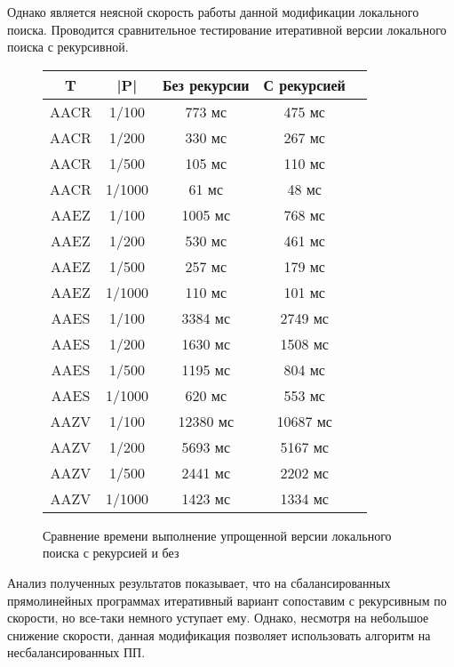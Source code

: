 \documentclass[14pt]{article}
\begin{document}
Однако является неясной скорость работы данной модификации локального поиска. Проводится сравнительное тестирование итеративной версии локального поиска с рекурсивной. 

\begin{figure}
	\begin{center}
\begin{tabular}{ | c | c | c | c | c |}
        \hline T & |P| & Без рекурсии & С рекурсией\\
        \hline AACR & 1/100 & 773 мс & 475  мс\\
        \hline AACR & 1/200 & 330 мс & 267  мс\\
        \hline AACR & 1/500 & 105 мс & 110  мс\\
        \hline AACR & 1/1000 & 61 мс & 48 мс\\
        \hline AAEZ & 1/100 & 1005 мс & 768  мс\\
        \hline AAEZ & 1/200 & 530 мс & 461  мс\\
        \hline AAEZ & 1/500 & 257 мс & 179  мс\\
        \hline AAEZ & 1/1000 & 110 мс & 101 мс\\
        \hline AAES & 1/100 & 3384 мс & 2749  мс\\
        \hline AAES & 1/200 & 1630 мс & 1508 мс\\
        \hline AAES & 1/500 & 1195 мс & 804  мс\\
        \hline AAES & 1/1000 & 620 мс & 553  мс\\
        \hline AAZV & 1/100 & 12380 мс & 10687  мс\\
        \hline AAZV & 1/200 & 5693 мс & 5167  мс\\
        \hline AAZV & 1/500 & 2441 мс & 2202   мс\\
        \hline AAZV & 1/1000 & 1423 мс & 1334  мс\\
		\hline
    \end{tabular}
        \end{center}
    \caption{Сравнение времени выполнение упрощенной версии локального поиска с рекурсией и без }
    \label{typical_research}
\end{figure}

Анализ полученных результатов показывает, что на сбалансированных прямолинейных программах итеративный вариант сопоставим с рекурсивным по скорости, но все-таки немного уступает ему. Однако, несмотря на небольшое снижение скорости, данная модификация позволяет использовать алгоритм на несбалансированных ПП.
\end{document}
